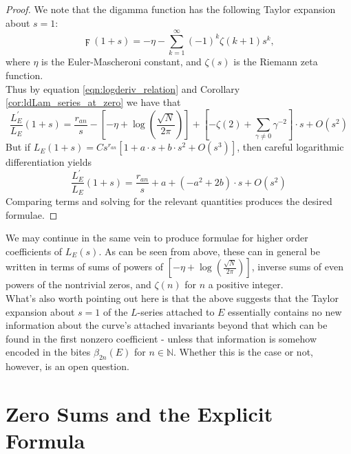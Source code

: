 \documentclass[10pt]{article}
\newcommand{\NN}{\mathbb{N}}
\newcommand{\pr}{^{\prime}}
\newcommand{\ldLe}[1]{\frac{L_E\pr}{L_E}\left(#1\right)}
\begin{document}
\begin{proof}
We note that the digamma function has the following Taylor expansion about $s=1$:
\begin{equation}
\digamma(1+s) = -\eta - \sum_{k=1}^{\infty} (-1)^k \zeta(k+1) s^k,
\end{equation}
where $\eta$ is the Euler-Mascheroni constant, and $\zeta(s)$ is the Riemann zeta function. \\
Thus by equation \ref{eqn:logderiv_relation} and Corollary \ref{cor:ldLam_series_at_zero} we have that
\begin{equation*}
\ldLe{1+s} = \frac{r_{an}}{s} - \left[-\eta + \log\left(\frac{\sqrt{N}}{2\pi}\right)\right] + \left[-\zeta(2) + \sum_{\gamma\ne0} \gamma^{-2}\right]\cdot s + O(s^2)
\end{equation*}
But if $L_E(1+s) = Cs^{r_{an}}\left[1 + a\cdot s + b\cdot s^2 + O(s^3)\right]$, then careful logarithmic differentiation yields
\begin{equation*}
\ldLe{1+s} = \frac{r_{an}}{s} + a + \left(-a^2 + 2b\right)\cdot s + O(s^2)
\end{equation*}
Comparing terms and solving for the relevant quantities produces the desired formulae.
\end{proof}
We may continue in the same vein to produce formulae for higher order coefficients of $L_E(s)$. As can be seen from above, these can in general be written in terms of sums of powers of $\left[-\eta + \log\left(\frac{\sqrt{N}}{2\pi}\right)\right]$, inverse sums of even powers of the nontrivial zeros, and $\zeta(n)$ for $n$ a positive integer. \\

What's also worth pointing out here is that the above suggests that the Taylor expansion about $s=1$ of the $L$-series attached to $E$ essentially contains no new information about the curve's attached invariants beyond that which can be found in the first nonzero coefficient - unless that information is somehow encoded in the bites $\beta_{2n}(E)$ for $n \in \NN$. Whether this is the case or not, however, is an open question.


\newpage
\section{Zero Sums and the Explicit Formula}
\end{document}
